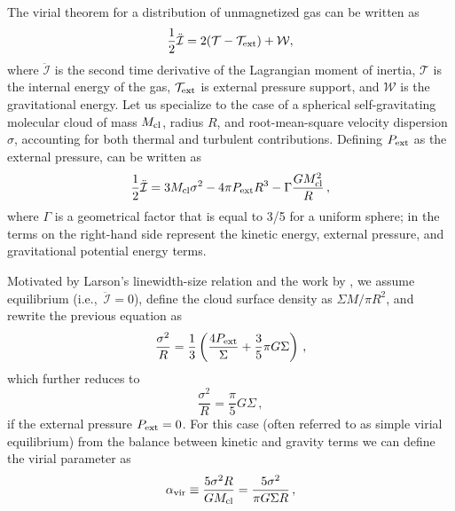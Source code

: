 \IfFileExists{emulateapjlegacy.cls}{\documentclass[iop]{emulateapjlegacy}}{\documentclass[iop]{emulateapj}}
\begin{document}
The virial theorem for a distribution of unmagnetized gas can be written as \citep{McKee92a}
\begin{equation}\label{eqn:virial_th_general}
\frac{1}{2}\ddot{\mathcal{I}} = 2(\mathcal{T} - \mathcal{T}_{\rm ext}) + \mathcal{W},
\end{equation}
where $\ddot{\mathcal{I}}$ is the second time derivative of the Lagrangian moment of inertia, $\mathcal{T}$ is the internal energy of the gas, $\mathcal{T}_{\rm ext}$ is external pressure support, and $\mathcal{W}$ is the gravitational energy.
%
Let us specialize to the case of a spherical self-gravitating molecular cloud of mass $M_{\rm cl}$, radius $R$, and root-mean-square velocity dispersion $\sigma$, accounting for both thermal and turbulent contributions. 
Defining $P_{\rm ext}$ as the external pressure,  can be written as
\begin{equation}
\frac{1}{2}{\ddot{\mathcal{I}}} = 3 M_{\rm cl} \sigma^2 - 4\pi P_{\rm ext} R^3 - \Gamma\frac{GM_{\rm cl}^2}{R}\,,
\label{eqn:virial}
\end{equation}
where $\Gamma$ is a geometrical factor that is equal to 3/5 for a uniform sphere; in  the terms on the right-hand side represent the
    kinetic energy, external pressure, and gravitational potential energy terms.

Motivated by Larson's linewidth-size relation \citep{Larson81a} and the work by \citet{Heyer09a}, we assume equilibrium (i.e.,\ ${\ddot{\mathcal{I}}}=0$), define the cloud surface density as
$\Sigma$\eq$M/\pi R^2$, and rewrite the previous equation as 
\begin{equation}
\frac{\sigma^2}{R} = \frac{1}{3}\left(\frac{4P_{\rm ext}}{\Sigma} + \frac{3}{5} \pi G \Sigma \right)\,,
\label{eqn:v0}
\end{equation}
which further reduces to 
\begin{equation}
\frac{\sigma^2}{R} = \frac{\pi}{5} G \Sigma\,,
\label{eqn:SVE}
\end{equation}
if the external pressure $P_{\rm ext}=0$. For this case (often referred to as simple virial equilibrium) from the balance between kinetic and gravity terms we can define the virial parameter as 
\begin{equation}
\alpha_{\rm vir} \equiv  \frac{5\sigma^2R}{GM_{\rm cl}} = \frac{5\sigma^2}{\pi G \Sigma R}\,,
\label{eqn:alpha}
\end{equation}
\end{document}
